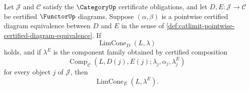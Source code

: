 \begin{theorem}
\label{thm:catlimit-transport-pointwise-certified-diagram-equivalence}
Let $\mathcal J$ and $\mathcal C$ satisfy the $\CategoryUp$ certificate obligations, and let $D,E:\mathcal J\to\mathcal C$ be certified $\FunctorUp$ diagrams. Suppose $(\alpha,\beta)$ is a pointwise certified diagram equivalence between $D$ and $E$ in the sense of \autoref{def:catlimit-pointwise-certified-diagram-equivalence}. If
$$
\operatorname{LimCone}_{D}(L,\lambda)
$$
holds, and if $\lambda^E$ is the component family obtained by certified composition
$$
\operatorname{Comp}_{\mathcal C}(L,D(j),E(j);\lambda_j,\alpha_j,\lambda^E_j)
$$
for every object $j$ of $\mathcal J$, then
$$
\operatorname{LimCone}_{E}(L,\lambda^E).
$$
\end{theorem}
